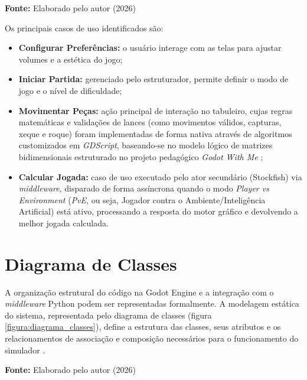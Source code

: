 \begin{center}
	\vspace{-0.2cm} %
	\small \textbf{Fonte:} Elaborado pelo autor (2026)
\end{center}

Os principais casos de uso identificados são:
\begin{itemize}
	\item \textbf{Configurar Preferências:} o usuário interage com as telas para ajustar volumes e a estética do jogo;
	\item \textbf{Iniciar Partida:} gerenciado pelo estruturador, permite definir o modo de jogo e o nível de dificuldade;
	\item \textbf{Movimentar Peças:} ação principal de interação no tabuleiro, cujas regras matemáticas e validações de lances (como movimentos válidos, capturas, xeque e roque) foram implementadas de forma nativa através de algoritmos customizados em \textit{GDScript}, baseando-se no modelo lógico de matrizes bidimensionais estruturado no projeto pedagógico \textit{Godot With Me} \cite{GodotWithMeVideo};
	\item \textbf{Calcular Jogada:} caso de uso executado pelo ator secundário (Stockfish) via \textit{middleware}, disparado de forma assíncrona quando o modo \textit{Player vs Environment} (\textit{PvE}, ou seja, Jogador contra o Ambiente/Inteligência Artificial) está ativo, processando a resposta do motor gráfico e devolvendo a melhor jogada calculada.
\end{itemize}

\section{Diagrama de Classes}

A organização estrutural do código na Godot Engine e a integração com o \textit{middleware} Python podem ser representadas formalmente. A modelagem estática do sistema, representada pelo diagrama de classes (figura \ref{figura:diagrama_classes}), define a estrutura das classes, seus atributos e os relacionamentos de associação e composição necessários para o funcionamento do simulador \cite{Massollar2005}.

\begin{center}
	\vspace{-0.2cm} %
	\small \textbf{Fonte:} Elaborado pelo autor (2026)
\end{center}

